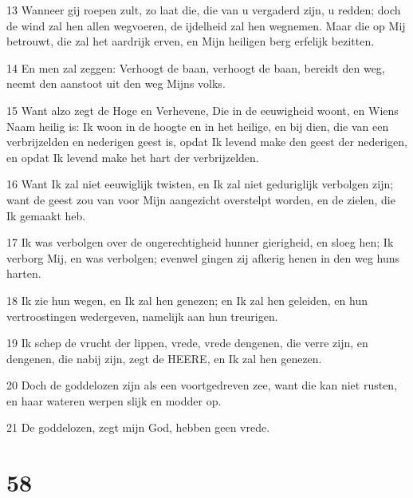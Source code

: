 \par 13 Wanneer gij roepen zult, zo laat die, die van u vergaderd zijn, u redden; doch de wind zal hen allen wegvoeren, de ijdelheid zal hen wegnemen. Maar die op Mij betrouwt, die zal het aardrijk erven, en Mijn heiligen berg erfelijk bezitten.
\par 14 En men zal zeggen: Verhoogt de baan, verhoogt de baan, bereidt den weg, neemt den aanstoot uit den weg Mijns volks.
\par 15 Want alzo zegt de Hoge en Verhevene, Die in de eeuwigheid woont, en Wiens Naam heilig is: Ik woon in de hoogte en in het heilige, en bij dien, die van een verbrijzelden en nederigen geest is, opdat Ik levend make den geest der nederigen, en opdat Ik levend make het hart der verbrijzelden.
\par 16 Want Ik zal niet eeuwiglijk twisten, en Ik zal niet geduriglijk verbolgen zijn; want de geest zou van voor Mijn aangezicht overstelpt worden, en de zielen, die Ik gemaakt heb.
\par 17 Ik was verbolgen over de ongerechtigheid hunner gierigheid, en sloeg hen; Ik verborg Mij, en was verbolgen; evenwel gingen zij afkerig henen in den weg huns harten.
\par 18 Ik zie hun wegen, en Ik zal hen genezen; en Ik zal hen geleiden, en hun vertroostingen wedergeven, namelijk aan hun treurigen.
\par 19 Ik schep de vrucht der lippen, vrede, vrede dengenen, die verre zijn, en dengenen, die nabij zijn, zegt de HEERE, en Ik zal hen genezen.
\par 20 Doch de goddelozen zijn als een voortgedreven zee, want die kan niet rusten, en haar wateren werpen slijk en modder op.
\par 21 De goddelozen, zegt mijn God, hebben geen vrede.

\chapter{58}

